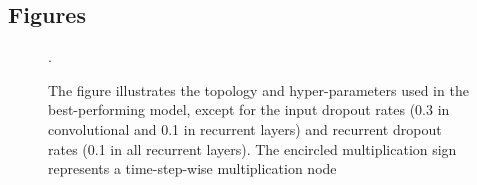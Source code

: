 \documentclass[twocolumn]{bmcart}%
\begin{document}
\begin{backmatter}




\section*{Figures}

\begin{figure}[h!]
  \caption{
      The figure illustrates the topology and hyper-parameters used in the best-performing model, except for the input dropout rates (0.3 in convolutional and 0.1 in recurrent layers) and recurrent dropout rates (0.1 in all recurrent layers).
   The encircled multiplication sign represents a time-step-wise multiplication node}.
   \label{fig:network}
\end{figure}




\end{backmatter}
\end{document}
